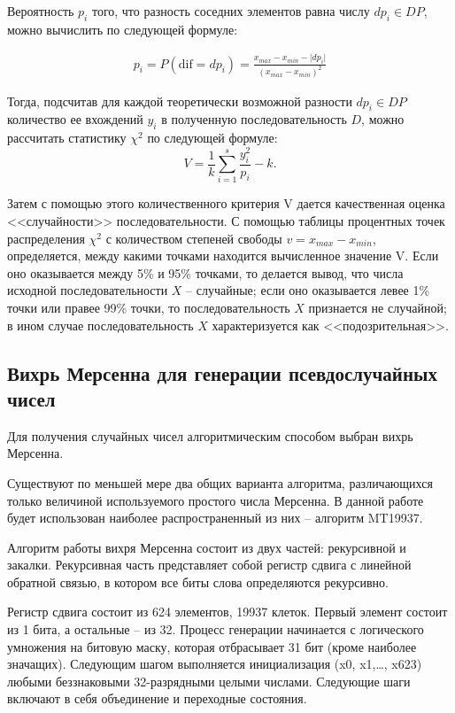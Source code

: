 \documentclass[14pt, a4paper]{extarticle}
\begin{document}
Вероятность $p_i$ того, что разность соседних элементов равна числу $dp_i \in DP$, можно вычислить по следующей формуле:

\begin{equation}
	\begin{gathered}
		p_i = P\left(\text{dif} = dp_i\right) = \frac{x_{max} - x_{min} - \lvert dp_i \lvert}{(x_{max} - x_{min})^2}
	\end{gathered}
\end{equation}

Тогда, подсчитав для каждой теоретически возможной разности $dp_i \in DP$ количество ее вхождений $y_i$ в полученную последовательность $D$, можно рассчитать статистику $\chi^2$ по следующей формуле:
\begin{equation}
	V = \frac{1}{k} \sum_{i = 1}^{s} \frac{y_{i}^2}{p_i} - k.
\end{equation}
 
Затем с помощью этого количественного критерия V дается качественная оценка <<случайности>> последовательности. С помощью таблицы процентных точек распределения $\chi^2$ с количеством степеней свободы $v=x_{max} - x_{min}$, определяется, между какими точками находится вычисленное значение V. Если оно оказывается между 5\% и 95\% точками, то делается вывод, что числа исходной последовательности $X$ -- случайные; если оно оказывается левее 1\% точки или правее 99\% точки, то последовательность $X$ признается не случайной; в ином случае последовательность $X$ характеризуется как <<подозрительная>>.


\subsection{Вихрь Мерсенна для генерации псевдослучайных чисел}

Для получения случайных чисел алгоритмическим способом выбран вихрь Мерсенна.

Существуют по меньшей мере два общих варианта алгоритма, различающихся только величиной используемого простого числа Мерсенна. В данной работе будет использован наиболее распространенный из них -- алгоритм MT19937.

Алгоритм работы вихря Мерсенна состоит из двух частей: рекурсивной и закалки. Рекурсивная часть представляет собой регистр сдвига с линейной обратной связью, в котором все биты слова определяются рекурсивно.

Регистр сдвига состоит из 624 элементов, 19937 клеток. Первый элемент состоит из 1 бита, а остальные -- из 32. Процесс генерации начинается с логического умножения на битовую маску, которая отбрасывает 31 бит (кроме наиболее значащих). Следующим шагом выполняется инициализация (x0, x1,…, x623) любыми беззнаковыми 32-разрядными целыми числами. Следующие шаги включают в себя объединение и переходные состояния.
\end{document}
